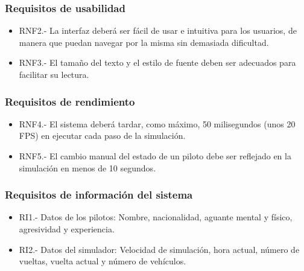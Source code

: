 \subsubsection{Requisitos de usabilidad}

\begin{itemize}
    \item RNF2.- La interfaz deberá ser fácil de usar e intuitiva para los usuarios, de manera que puedan navegar por la misma sin demasiada dificultad.
    \item RNF3.- El tamaño del texto y el estilo de fuente deben ser adecuados para facilitar su lectura.
\end{itemize}

\subsubsection{Requisitos de rendimiento}

\begin{itemize}
    \item RNF4.- El sistema deberá tardar, como máximo, 50 milisegundos (unos 20 FPS) en ejecutar cada paso de la simulación.
    \item RNF5.- El cambio manual del estado de un piloto debe ser reflejado en la simulación en menos de 10 segundos.
\end{itemize}

\subsubsection{Requisitos de información del sistema}

\begin{itemize}
    \item RI1.- Datos de los pilotos: Nombre, nacionalidad, aguante mental y físico, agresividad y experiencia.
    \item RI2.- Datos del simulador: Velocidad de simulación, hora actual, número de vueltas, vuelta actual y número de vehículos.
\end{itemize}

